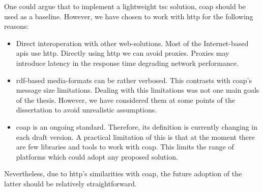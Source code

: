 One could argue that to implement a lightweight \ac{tsc} solution, \ac{coap} should be used as a baseline.
However, we have chosen to work with \ac{http} for the following reasons:
\begin{itemize}
  \item Direct interoperation with other web-solutions.
        Most of the Internet-based \ac{api}s use \ac{http}.
        Directly using \ac{http} we can avoid proxies.
        Proxies may introduce latency in the response time degrading network performance. %
  \item \ac{rdf}-based media-formats can be rather verbosed.
	This contrasts with \ac{coap}'s message size limitations.
	Dealing with this limitations was not one main goals of the thesis.
	However, we have considered them at some points of the dissertation to avoid unrealistic assumptions.
  \item \ac{coap} is an ongoing standard.
        Therefore, its definition is currently changing in each draft version.
        A practical limitation of this is that at the moment there are few libraries and tools to work with \ac{coap}.
        This limits the range of platforms which could adopt any proposed solution.
\end{itemize}


Nevertheless, due to \ac{http}'s similarities with \ac{coap}, the future adoption of the latter should be relatively straightforward.

